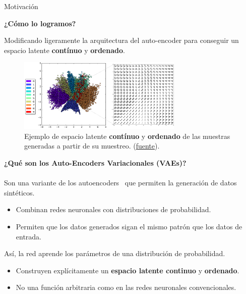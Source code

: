 \begin{frame}{Motivación}

\textbf{¿Cómo lo logramos?}

Modificando ligeramente la arquitectura del auto-encoder para conseguir un espacio latente \textbf{contínuo} y \textbf{ordenado}.

\begin{figure}
    \centering
    \includegraphics[width=0.7\textwidth]{Slides/figures/02_Metodos_Generativos/vae-continuous-latent-space.png}
    \caption{Ejemplo de espacio latente \textbf{contínuo} y \textbf{ordenado} de las muestras generadas a partir de su muestreo. (\href{https://indico.ictp.it/event/8674/session/155/contribution/1121/material/slides/0.pdf}{fuente}).}
    \label{fig:enter-label}
\end{figure}

\end{frame}

\begin{frame}{}

\textbf{¿Qué son los Auto-Encoders Variacionales (VAEs)?}
\\
\\
Son una variante de los autoencoders~\cite{kingma2019introduction} que permiten la generación de datos sintéticos.

\begin{itemize}
    \item Combinan redes neuronales con distribuciones de probabilidad.
    \item Permiten que los datos generados sigan el mismo patrón que los datos de entrada.
\end{itemize}

Así, la red aprende los parámetros de una distribución de probabilidad.

\begin{itemize}
    \item Construyen explícitamente un \textbf{espacio latente continuo} y \textbf{ordenado}.
    \item No una función arbitraria como en las redes neuronales convencionales.
\end{itemize}
\end{frame}

